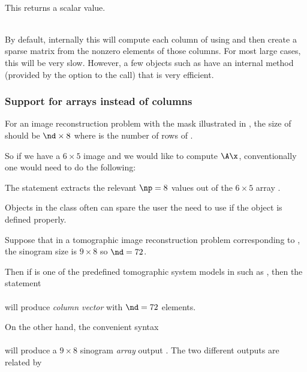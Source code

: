 \blist
\item
{}
\\
This returns a scalar value. %
\item
{}
\\
By default, internally this will compute each column of \A
using 
and then create a sparse matrix
from the nonzero elements of those columns.
For most large cases,
this will be very slow.
However,
a few \fatrixx objects
such as 
have an internal  method
(provided by the  option
to the  call)
that is very efficient.

\elist


\subsubsection
{
Support for arrays instead of columns
}

For an image reconstruction problem
with the mask illustrated in ,
the size of  should be
$\nd \times 8$
where \nd is the number of rows of \A.

So if we have a $6 \times 5$ image 
and we would like to compute
$\A \x$,
conventionally
one would need to do the following:
\\

The statement 
extracts the relevant $\np = 8$ values
out of the $6 \times 5$ array .

Objects in the \fatrixx class
often can spare the user the need to use 
if the object is defined properly.

Suppose that in a tomographic image reconstruction problem
corresponding to ,
the sinogram size is $9 \times 8$
so $\nd = 72$.

Then if  is one of the predefined tomographic system models
in \irt such as ,
then the statement
\\
\\
will produce \emph{column vector} 
with $\nd = 72$ elements.

On the other hand,
the convenient syntax
\\
\\
will produce a $9 \times 8$ sinogram \emph{array} output .
The two different outputs
are related by
\\


